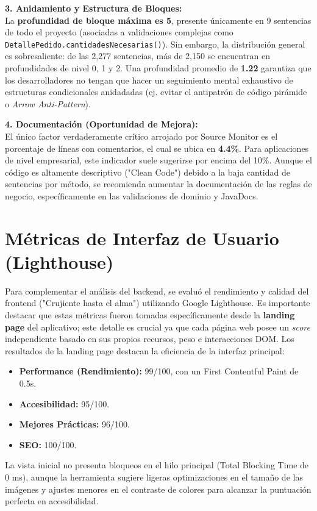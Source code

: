 \documentclass[12pt, a4paper]{article}
\begin{document}
\textbf{3. Anidamiento y Estructura de Bloques:} \\
La \textbf{profundidad de bloque máxima es 5}, presente únicamente en 9 sentencias de todo el proyecto (asociadas a validaciones complejas como \texttt{DetallePedido.cantidadesNecesarias()}). Sin embargo, la distribución general es sobresaliente: de las 2,277 sentencias, más de 2,150 se encuentran en profundidades de nivel 0, 1 y 2. Una profundidad promedio de \textbf{1.22} garantiza que los desarrolladores no tengan que hacer un seguimiento mental exhaustivo de estructuras condicionales anidadadas (ej. evitar el antipatrón de código pirámide o \textit{Arrow Anti-Pattern}).

\textbf{4. Documentación (Oportunidad de Mejora):} \\
El único factor verdaderamente crítico arrojado por Source Monitor es el porcentaje de líneas con comentarios, el cual se ubica en \textbf{4.4\%}. Para aplicaciones de nivel empresarial, este indicador suele sugerirse por encima del 10\%. Aunque el código es altamente descriptivo ("Clean Code") debido a la baja cantidad de sentencias por método, se recomienda aumentar la documentación de las reglas de negocio, específicamente en las validaciones de dominio y JavaDocs.

\section{Métricas de Interfaz de Usuario (Lighthouse)}
Para complementar el análisis del backend, se evaluó el rendimiento y calidad del frontend ("Crujiente hasta el alma") utilizando Google Lighthouse. Es importante destacar que estas métricas fueron tomadas específicamente desde la \textbf{landing page} del aplicativo; este detalle es crucial ya que cada página web posee un \textit{score} independiente basado en sus propios recursos, peso e interacciones DOM. Los resultados de la landing page destacan la eficiencia de la interfaz principal:

\begin{itemize}
    \item \textbf{Performance (Rendimiento):} 99/100, con un First Contentful Paint de 0.5s.
    \item \textbf{Accesibilidad:} 95/100.
    \item \textbf{Mejores Prácticas:} 96/100.
    \item \textbf{SEO:} 100/100.
\end{itemize}

La vista inicial no presenta bloqueos en el hilo principal (Total Blocking Time de 0 ms), aunque la herramienta sugiere ligeras optimizaciones en el tamaño de las imágenes y ajustes menores en el contraste de colores para alcanzar la puntuación perfecta en accesibilidad.
\end{document}
